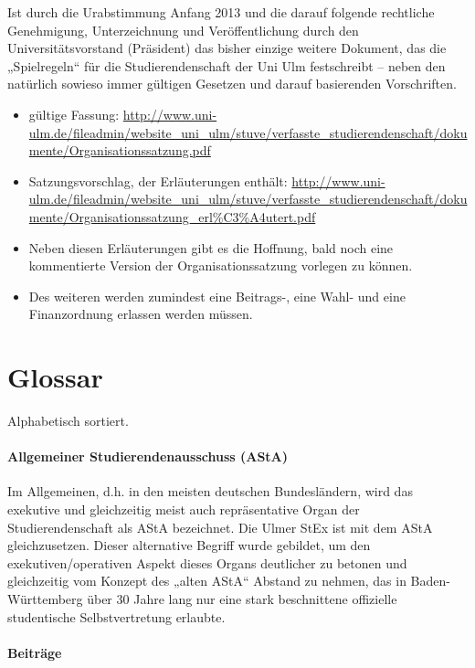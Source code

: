 \documentclass[
10pt,
a4paper,
twoside,								%
titlepage=false,							%
draft=false								%
]{scrartcl}
\begin{document}
Ist durch die Urabstimmung Anfang 2013 und die darauf folgende rechtliche Genehmigung, Unterzeichnung und Veröffentlichung durch den Universitätsvorstand (Präsident) das bisher einzige weitere Dokument, das die „Spielregeln“ für die Studierendenschaft der Uni Ulm festschreibt – neben den natürlich sowieso immer gültigen Gesetzen und darauf basierenden Vorschriften.

\begin{itemize}
	\item gültige Fassung: \sloppy  \url{http://www.uni-ulm.de/fileadmin/website_uni_ulm/stuve/verfasste_studierendenschaft/dokumente/Organisationssatzung.pdf}
	\item Satzungsvorschlag, der Erläuterungen enthält: \url{http://www.uni-ulm.de/fileadmin/website_uni_ulm/stuve/verfasste_studierendenschaft/dokumente/Organisationssatzung_erl%C3%A4utert.pdf}
	\item Neben diesen Erläuterungen gibt es die Hoffnung, bald noch eine kommentierte Version der Organisationssatzung vorlegen zu können.
	\item Des weiteren werden zumindest eine Beitrags-, eine  Wahl- und eine Finanzordnung erlassen werden müssen.
\end{itemize}


\newpage
\section{Glossar}
\label{sec:Glossar}

Alphabetisch sortiert.



\paragraph{Allgemeiner Studierendenausschuss (AStA)}

Im Allgemeinen, d.h. in den meisten deutschen Bundesländern, wird das exekutive und gleichzeitig meist auch repräsentative Organ der Studierendenschaft als AStA bezeichnet. Die Ulmer StEx ist mit dem AStA gleichzusetzen. Dieser alternative Begriff wurde gebildet, um den exekutiven/operativen Aspekt dieses Organs deutlicher zu betonen und gleichzeitig vom Konzept des „alten AStA“ Abstand zu nehmen, das in Baden-Württemberg über 30 Jahre lang nur eine stark beschnittene offizielle studentische Selbstvertretung erlaubte.



\paragraph{Beiträge}
\end{document}

